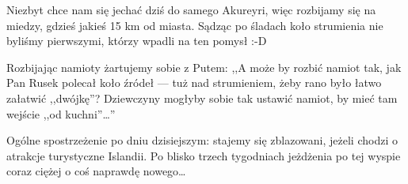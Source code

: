 Niezbyt chce nam się jechać dziś do samego Akureyri, więc rozbijamy się na miedzy, gdzieś jakieś 15 km od miasta. Sądząc po śladach koło strumienia nie byliśmy pierwszymi, którzy wpadli na ten pomysł :-D

Rozbijając namioty żartujemy sobie z Putem: ,,A może by rozbić namiot tak, jak Pan Rusek polecał koło źródeł --- tuż nad strumieniem, żeby rano było łatwo załatwić ,,dwójkę''? Dziewczyny mogłyby sobie tak ustawić namiot, by mieć tam wejście ,,od kuchni''…''


Ogólne spostrzeżenie po dniu dzisiejszym: stajemy się zblazowani, jeżeli chodzi o atrakcje turystyczne Islandii. Po blisko trzech tygodniach jeżdżenia po tej wyspie coraz ciężej o coś naprawdę nowego…
